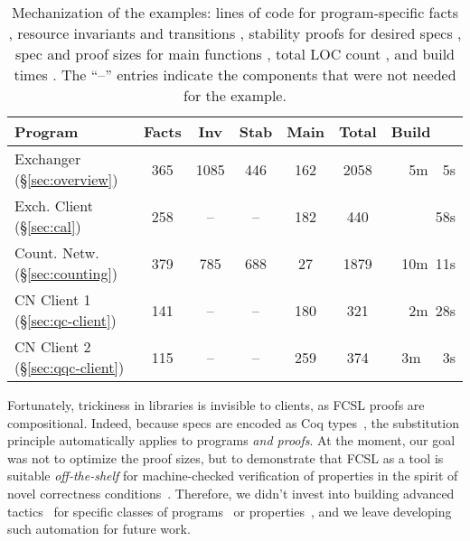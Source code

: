
{
\begin{table}
{%
\sffamily\small %
\centering
\begin{tabular}{|@{\ }l@{\ }||@{\ }c@{\ }|@{\ }c@{\ }|@{\ }c@{\ }|@{\ }c@{\ }|@{\ }c@{\ }||@{\ }r@{\ }|}
  \hline
  \textbf{Program} &  
  {Facts} & {Inv} &
  {Stab} & {Main} & \textbf{Total}
  & \textbf{Build~~~}    
  \\ \hline \hline 
  Exchanger \hfill (\S \ref{sec:overview}) & 365 & 1085 & 446 & 162 & 2058 & 5m~~5s
  \\
  Exch. Client \hfill (\S \ref{sec:cal}) & 258 & -- &--& 182 & 440 & 58s
  \\
  Count. Netw. \hfill (\S \ref{sec:counting}) & 379 & 785 & 688 & 27 & 1879 & 10m~11s
  \\
  CN Client 1 \hfill (\S \ref{sec:qc-client}) & 141 &--&--& 180  & 321 & 2m~28s
  \\
  CN Client 2 \hfill (\S \ref{sec:qqc-client})& 115 &--&--& 259 & 374 & 3m~~~3s 
  \\[2pt] \hline
\end{tabular}
}
\caption{
  Mechanization of the examples: lines of code for program-specific facts ,
  resource invariants and transitions , 
  stability proofs for desired specs , spec and proof sizes for main
  functions , total LOC count , and build
  times . The ``--'' entries indicate the
  components that were not needed for the example.
} 
\label{tab:locs}
\end{table}}

Fortunately, trickiness in libraries is invisible to clients, as FCSL
proofs are compositional. Indeed, because specs are encoded as Coq
types~\cite{Sergey-al:PLDI15}, the substitution principle
automatically applies to programs \emph{and proofs}.
%
%
At the moment, our goal was not to optimize the proof sizes, but to
demonstrate that FCSL as a tool is suitable \emph{off-the-shelf} for
machine-checked verification of properties in the spirit of novel
correctness
conditions~\cite{Hemed-al:DISC15,Aspnes-al:JACM94,Jagadeesan-Riely:ICALP14}.
Therefore, we didn't invest into building advanced
tactics~\cite{Chlipala:PLDI11,McCreight:TPHOL09} for specific classes
of programs~\cite{Zee-al:PLDI08} or
properties~\cite{Dragoi-al:CAV13,Vafeiadis:CAV10,Bouajjani-al:POPL15,Burckhardt-al:PLDI10},
and we leave developing such automation for future work.

